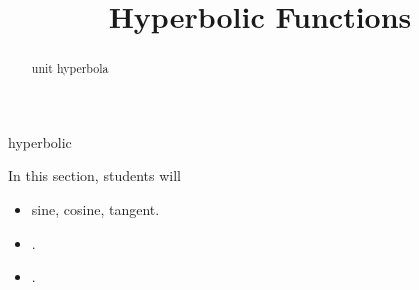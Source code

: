 \documentclass{ximera}
\title{Hyperbolic Functions}
\begin{document}
\begin{abstract}
unit hyperbola
\end{abstract}
\maketitle




hyperbolic












\begin{sectionOutcomes}
In this section, students will 

\begin{itemize}
\item sine, cosine, tangent.
\item .
\item .
\end{itemize}
\end{sectionOutcomes}
\end{document}
